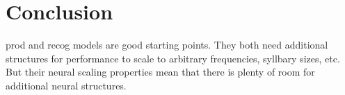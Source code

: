 \chapter{Conclusion}
\label{chapt:conclusion}


prod and recog models are good starting points.
They both need additional structures
for performance to scale to
arbitrary frequencies, syllbary sizes, etc.
But their neural scaling properties mean
that there is plenty of room for additional
neural structures.
